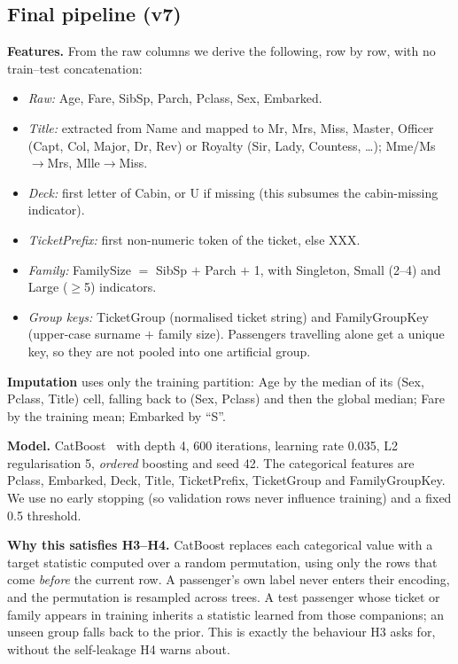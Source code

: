 \documentclass[10pt,twocolumn,letterpaper]{article}
\begin{document}
\subsection{Final pipeline (v7)}
\textbf{Features.} From the raw columns we derive the following, row by row, with no train--test concatenation:
\begin{itemize}
\item \emph{Raw:} Age, Fare, SibSp, Parch, Pclass, Sex, Embarked.
\item \emph{Title:} extracted from Name and mapped to Mr, Mrs, Miss, Master, Officer (Capt, Col, Major, Dr, Rev) or Royalty (Sir, Lady, Countess, \dots); Mme/Ms$\to$Mrs, Mlle$\to$Miss.
\item \emph{Deck:} first letter of Cabin, or U if missing (this subsumes the cabin-missing indicator).
\item \emph{TicketPrefix:} first non-numeric token of the ticket, else XXX.
\item \emph{Family:} FamilySize $=$ SibSp $+$ Parch $+$ 1, with Singleton, Small (2--4) and Large ($\geq$5) indicators.
\item \emph{Group keys:} TicketGroup (normalised ticket string) and FamilyGroupKey (upper-case surname $+$ family size). Passengers travelling alone get a unique key, so they are not pooled into one artificial group.
\end{itemize}

\textbf{Imputation} uses only the training partition: Age by the median of its (Sex, Pclass, Title) cell, falling back to (Sex, Pclass) and then the global median; Fare by the training mean; Embarked by ``S''.

\textbf{Model.} CatBoost~\cite{catboost} with depth 4, 600 iterations, learning rate 0.035, L2 regularisation 5, \emph{ordered} boosting and seed 42. The categorical features are Pclass, Embarked, Deck, Title, TicketPrefix, TicketGroup and FamilyGroupKey. We use no early stopping (so validation rows never influence training) and a fixed 0.5 threshold.

\textbf{Why this satisfies H3--H4.} CatBoost replaces each categorical value with a target statistic computed over a random permutation, using only the rows that come \emph{before} the current row. A passenger's own label never enters their encoding, and the permutation is resampled across trees. A test passenger whose ticket or family appears in training inherits a statistic learned from those companions; an unseen group falls back to the prior. This is exactly the behaviour H3 asks for, without the self-leakage H4 warns about.
\end{document}
